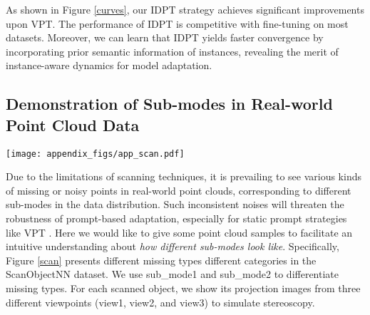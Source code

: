 \documentclass[10pt,twocolumn,letterpaper]{article}
\begin{document}
As shown in Figure \ref{curves}, our IDPT strategy achieves significant improvements upon VPT. 
The performance of IDPT is competitive with fine-tuning on most datasets. 
Moreover, we can learn that IDPT yields faster convergence by incorporating prior semantic information of instances, revealing the merit of instance-aware dynamics for model adaptation. 






\subsection{Demonstration of Sub-modes in Real-world Point Cloud Data}

\begin{figure*}[h]
\centering
\texttt{[image: appendix\_figs/app\_scan.pdf]} 
\caption{Different sub-modes in each category of ScanObjectNN}
\label{scan}
\end{figure*}

Due to the limitations of scanning techniques, 
it is prevailing to see various kinds of missing or noisy points in real-world point clouds, corresponding to different sub-modes in the data distribution. 
Such inconsistent noises will threaten the robustness of prompt-based adaptation, especially for static prompt strategies like VPT \cite{jia2022visual}.  
Here we would like to give some point cloud samples to facilitate an intuitive understanding about \emph{how different sub-modes look like}. 
Specifically, Figure \ref{scan} presents different missing types \wrt different categories in the ScanObjectNN dataset. 
We use sub\_mode1 and sub\_mode2 to differentiate missing types. 
For each scanned object, we show its projection images from three different viewpoints (\ie view1, view2, and view3) to simulate stereoscopy.
\end{document}
